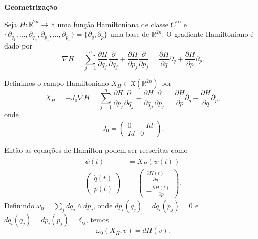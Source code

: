 \documentclass{beamer}
\newcommand{\titulo}[1]{\centering \textbf{#1}}
\newcommand{\campohamiltoniano}[1]{X_{H}(#1)}
\newcommand{\campohamiltonianoabrev}{X_{H}}
\newcommand{\campossuaves}[1]{\mathfrak{X}(#1)}
\newcommand{\derivadaparcial}[2]{\frac{\partial #1}{\partial #2}}
\newcommand{\derivadaparcialabrev}[1]{\partial_{#1}}
\newcommand{\estruturacomplexa}{J_{0}}
\newcommand{\formaSimpleticaPadrao}[2]{\omega_{0}(#1, #2)}
\newcommand{\real}[1]{\mathbb{R}^{#1}}
\newcommand{\reta}{\real{}}
\begin{document}
\begin{frame}
	\titulo{Geometrização}
	
	Seja $H:\real{2n} \to \reta$ uma função Hamiltoniana de classe $C^{\infty}$ e $\{\partial_{q_{1}}, \dots, \partial_{q_{n}}, \partial_{p_{1}}, \dots, \partial_{p_{n}}\}=\{\partial_{q}, \partial_{p}\}$ uma base de $\real{2n}$. O gradiente Hamiltoniano é dado por
	$$
	\nabla H =\sum_{j=1}^{n}\derivadaparcial{H}{q_{j}}\derivadaparcial{}{q_{j}} + \derivadaparcial{H}{p_{j}}\derivadaparcial{}{p_{j}} = \derivadaparcial{H}{q}\derivadaparcialabrev{q} + \derivadaparcial{H}{p}\derivadaparcialabrev{p}.
	$$
	
	Definimos o campo Hamiltoniano $\campohamiltonianoabrev \in \campossuaves{\real{2n}}$ por 
	$$
	\campohamiltonianoabrev = -\estruturacomplexa \nabla H = \sum_{j=1}^{n}\derivadaparcial{H}{p_{j}}\derivadaparcial{}{q_{j}} - \derivadaparcial{H}{q_{j}}\derivadaparcial{}{p_{j}} = \derivadaparcial{H}{p}\derivadaparcialabrev{q} - \derivadaparcial{H}{q}\derivadaparcialabrev{p}, 
	$$
	onde
	$$
	\estruturacomplexa=
	\left(
	\begin{array}{cc}
	0 & -Id
	\\
	Id & 0
	\end{array}
	\right). 
	$$
\end{frame}

\begin{frame}
	 Então as equações de Hamilton podem ser reescritas como 
	 $$
	 \begin{aligned}
	 \dot{\psi}(t) &= \campohamiltoniano{\psi(t)}
	 \\
	 \left(
	 \begin{array}{c}
	 \dot{q}(t)
	 \\
	 \dot{p}(t)
	 \end{array}
	 \right)
	 &=
	 \left(
	 \begin{array}{c}
	 \derivadaparcial{H(t)}{q}
	 \\
	 -\derivadaparcial{H(t)}{p}
	 \end{array}
	 \right).
	 \end{aligned}
	 $$
	 Definindo $\omega_{0}= \sum_{j}  dq_{j}\wedge dp_{j}$, onde $dp_{i}(q_{j}) = dq_{i}(p_{j}) = 0$ e $dq_{i}(q_{j}) = dp_{i}(p_{j}) = \delta_{ij}$, temos
	 $$
	 \formaSimpleticaPadrao{\campohamiltonianoabrev}{v} = dH(v).
	 $$
	 
\end{frame}
\end{document}
